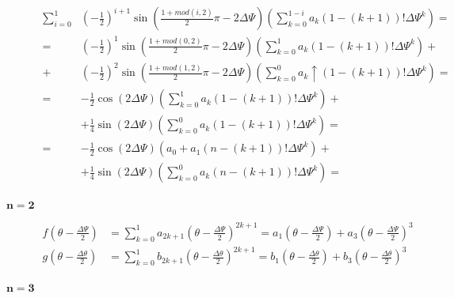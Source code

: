 \documentclass[review]{elsarticle}
\begin{document}
\begin{description}
\begin{equation}
\begin{aligned}
\sum_{i=0}^{1}&\left(-\frac{1}{2}\right)^{i+1}\sin\left(\frac{1+mod\left(i,2\right)}{2}\pi-2\Delta\Psi\right)\left(\sum_{k=0}^{1-i}a_{k}\left(1-\left(k+1\right)\right)!\Delta\Psi^{k}\right)=\\
=&\left(-\frac{1}{2}\right)^{1}\sin\left(\frac{1+mod\left(0,2\right)}{2}\pi-2\Delta\Psi\right)\left(\sum_{k=0}^{1}a_{k}\left(1-\left(k+1\right)\right)!\Delta\Psi^{k}\right)+\\
+&\left(-\frac{1}{2}\right)^{2}\sin\left(\frac{1+mod\left(1,2\right)}{2}\pi-2\Delta\Psi\right)\left(\sum_{k=0}^{0}a_{k}↑\left(1-\left(k+1\right)\right)!\Delta\Psi^{k}\right)=\\
=&-\frac{1}{2}\cos\left(2\Delta\Psi\right)\left(\sum_{k=0}^{1}a_{k}\left(1-\left(k+1\right)\right)!\Delta\Psi^{k}\right)+\\
&+\frac{1}{4}\sin\left(2\Delta\Psi\right)\left(\sum_{k=0}^{0}a_{k}\left(1-\left(k+1\right)\right)!\Delta\Psi^{k}\right)=\\
=&-\frac{1}{2}\cos\left(2\Delta\Psi\right)\left(a_{0}+a_{1}\left(n-\left(k+1\right)\right)!\Delta\Psi^{k}\right)+\\
&+\frac{1}{4}\sin\left(2\Delta\Psi\right)\left(\sum_{k=0}^{0}a_{k}\left(n-\left(k+1\right)\right)!\Delta\Psi^{k}\right)=\\
\end{aligned}
\end{equation}

\item[$\mathbf{n=2}$]

\begin{equation}
\begin{aligned}
f\left(\theta-\frac{\Delta\Psi}{2}\right)&=\sum_{k=0}^{1}a_{2k+1}\left(\theta-\frac{\Delta\Psi}{2}\right)^{2k+1}=a_{1}\left(\theta-\frac{\Delta\Psi}{2}\right)+a_{3}\left(\theta-\frac{\Delta\Psi}{2}\right)^{3}\\
g\left(\theta-\frac{\Delta\theta}{2}\right)&=\sum_{k=0}^{1}b_{2k+1}\left(\theta-\frac{\Delta\theta}{2}\right)^{2k+1}=b_{1}\left(\theta-\frac{\Delta\theta}{2}\right)+b_{3}\left(\theta-\frac{\Delta\theta}{2}\right)^{3}\\
\end{aligned}
\end{equation}

\item[$\mathbf{n=3}$]


\end{description}
\end{document}
